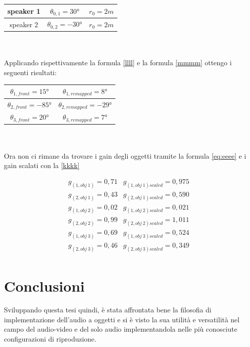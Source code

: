 \documentclass[12pt,a4paper]{report}
\begin{document}
\begin{itemize}
\begin{tabular}{|c|c|c|}
\hline
speaker 1 & $\theta_{0,1}=30°$ & $r_0=2m$\\
\hline
speaker 2 & $\theta_{0,2}=-30°$ & $r_0=2m$\\
\hline
\end{tabular} \\
\\

Applicando rispettivamente la formula \ref{llll} e la formula \ref{mmmm} ottengo i seguenti risultati:


\begin{tabular}{|c|c|}
\hline
$\theta_{1,front} = 15°$     & $\theta_{1,remapped} =  8°  $   \\
\hline
$\theta_{2,front} = -85°$     & $\theta_{2,remapped} = -29° $     \\
\hline
$\theta_{3,front} = 20°$    & $ \theta_{3,remapped} =  7° $    \\
\hline
\end{tabular} \\
\\

Ora non ci rimane da trovare i gain degli oggetti tramite la formula \ref{eq:eeee} e i gain scalati con la \ref{kkkk}

\begin{equation}
\begin{matrix}
g_{(1,obj\ 1)} = 0,71 & g_{(1,obj\ 1)scaled} = 0,975\\
g_{(2,obj\ 1)} = 0,43 & g_{(2,obj\ 1)scaled} = 0,590\\
g_{(1,obj\ 2)} = 0,02 & g_{(1,obj\ 2)scaled} = 0,021\\
g_{(2,obj\ 2)} = 0,99 & g_{(2,obj\ 2)scaled} = 1,011\\
g_{(1,obj\ 3)} = 0,69 & g_{(1,obj\ 3)scaled} = 0,524\\
g_{(2,obj\ 3)} = 0,46 & g_{(2,obj\ 3)scaled} = 0,349\\
\end{matrix}
\label{gscalatiesempio3}
\end{equation}










\chapter*{Conclusioni}

Sviluppando questa tesi quindi, è stata affrontata bene la filosofia di implementazione dell'audio a oggetti e si è visto la sua utilità e versatilità nel campo del audio-video e del solo audio implementandola nelle più conosciute configurazioni di riproduzione.


\end{itemize}
\end{document}
